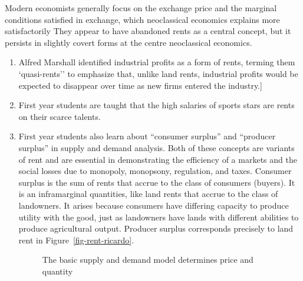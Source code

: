  Modern economists generally focus  on the exchange price and the marginal conditions satisfied in exchange, which neoclassical economics explains more satisfactorily They appear to have abandoned rents as a central concept, but it  persists in slightly covert forms at the centre  neoclassical economics. 
\begin{enumerate}
    \item Alfred Marshall identified industrial profits as a form of rents, terming them `quasi-rents'' to emphasize that, unlike land rents, industrial profits would  be expected to disappear over time as new firms entered the industry.]
    \item First year students are taught that the high salaries of  sports stars are rents on their scarce talents. 
    \item First year students also learn about ``consumer surplus'' and ``producer surplus'' in supply and demand analysis. Both of these concepts are variants of rent and are essential in demonstrating the efficiency of a markets and the social losses due to monopoly, monopsony, regulation, and taxes. Consumer surplus is the sum of rents that accrue to the class of consumers (buyers). It is an inframarginal quantities, like land  rents that accrue to the class of landowners. It arises because consumers have differing capacity to produce  utility with the good, just as landowners have lands with different abilities to produce agricultural output. Producer surplus corresponds precisely to land rent in Figure~\ref{fig-rent-ricardo}.  

    
 \begin{figure}[h!]
\begin{center}
\caption{The basic supply and demand model determines price and quantity }
\label{fig:Equilibrium}
\end{center}
\end{figure}


\end{enumerate}
